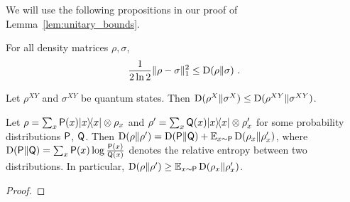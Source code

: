We will use the following propositions in our proof of Lemma~\ref{lem:unitary_bounds}.

\begin{proposition}
\label{prop:pinsker}
	For all density matrices $\rho, \sigma$, 
	\[
		 \frac{1}{2 \ln 2} \| \rho - \sigma \|^2_1 \leq \D(\rho \| \sigma)~.
	\]
\end{proposition}


\begin{proposition}
\label{prop:divergence_data_processing}
Let $\rho^{XY}$ and $\sigma^{XY}$ be quantum states. Then $\D(\rho^{X} \| \sigma^X) \leq \D(\rho^{XY} \| \sigma^{XY})$.
\end{proposition}

\begin{proposition}
\label{prop:divergence_chain_rule}
	Let $\rho = \sum_x \P(x) \ketbra{x}{x} \otimes \rho_x$ and $\rho' = \sum_x \Qsf(x) \ketbra{x}{x} \otimes \rho'_x$ for some probability distributions $\P$, $\Qsf$. Then $\D(\rho \| \rho') = \D(\P \| \Qsf) + \Ex_{x \sim \P} \D(\rho_x \| \rho_x') $, where $\D(\P \| \Qsf) = \sum_x \P(x) \log \frac{\P(x)}{\Qsf(x)}$ denotes the relative entropy between two distributions. In particular, $\D(\rho \| \rho') \geq \Ex_{x \sim \P} \D(\rho_x \| \rho_x')$.
\end{proposition}
\begin{proof}
	
\end{proof}
%

%

%


